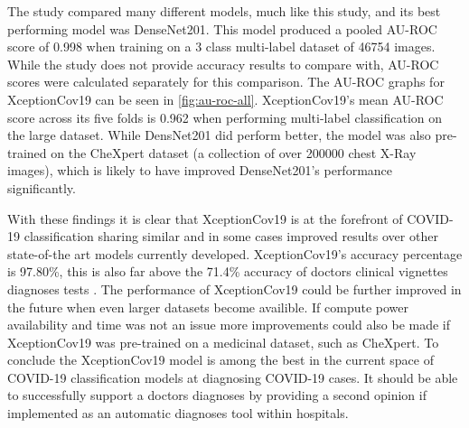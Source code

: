 The \cite{bressem2020comparing} study compared many different models, much like this study, and its best performing model was DenseNet201. This model produced a pooled AU-ROC score of 0.998 when training on a 3 class multi-label dataset of 46754 images. While the study does not provide accuracy results to compare with, AU-ROC scores were calculated separately for this comparison. The AU-ROC graphs for XceptionCov19 can be seen in \autoref{fig:au-roc-all}. XceptionCov19's mean AU-ROC score across its five folds is 0.962 when performing multi-label classification on the large dataset. While \cite{bressem2020comparing} DensNet201 did perform better, the model was also pre-trained on the CheXpert dataset (a collection of over 200000 chest X-Ray images), which is likely to have improved DenseNet201's performance significantly.

With these findings it is clear that XceptionCov19 is at the forefront of COVID-19 classification sharing similar and in some cases improved results over other state-of-the art models currently developed. XceptionCov19's accuracy percentage is 97.80\%, this is also far above the 71.4\% accuracy of doctors clinical vignettes diagnoses tests \citep{richens2020improving}. The performance of XceptionCov19 could be further improved in the future when even larger datasets become availible. If compute power availability and time was not an issue more improvements could also be made if XceptionCov19 was pre-trained on a medicinal dataset, such as CheXpert. To conclude the XceptionCov19 model is among the best in the current space of COVID-19 classification models at diagnosing COVID-19 cases. It should be able to successfully support a doctors diagnoses by providing a second opinion if implemented as an automatic diagnoses tool within hospitals.

